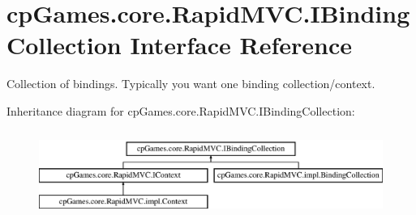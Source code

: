 \hypertarget{interfacecp_games_1_1core_1_1_rapid_m_v_c_1_1_i_binding_collection}{}\section{cp\+Games.\+core.\+Rapid\+M\+V\+C.\+I\+Binding\+Collection Interface Reference}
\label{interfacecp_games_1_1core_1_1_rapid_m_v_c_1_1_i_binding_collection}


Collection of bindings. Typically you want one binding collection/context.  


Inheritance diagram for cp\+Games.\+core.\+Rapid\+M\+V\+C.\+I\+Binding\+Collection\+:\begin{figure}[H]
\begin{center}
\leavevmode
\includegraphics[height=2.847458cm]{interfacecp_games_1_1core_1_1_rapid_m_v_c_1_1_i_binding_collection}
\end{center}
\end{figure}
